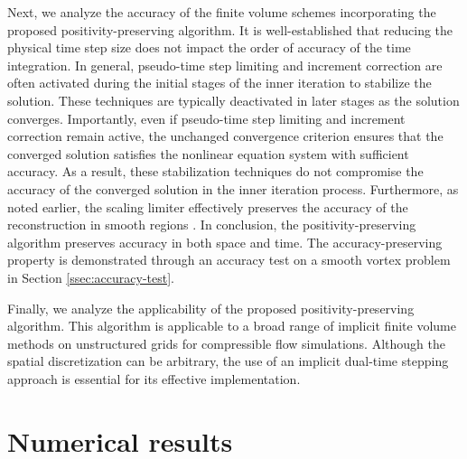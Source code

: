 Next, we analyze the accuracy of the finite volume schemes incorporating the proposed positivity-preserving algorithm. It is well-established that reducing the physical time step size does not impact the order of accuracy of the time integration.
In general, pseudo-time step limiting and increment correction are often activated during the initial stages of the inner iteration to stabilize the solution. These techniques are typically deactivated in later stages as the solution converges. Importantly, even if pseudo-time step limiting and increment correction remain active, the unchanged convergence criterion ensures that the converged solution satisfies the nonlinear equation system with sufficient accuracy. As a result, these stabilization techniques do not compromise the accuracy of the converged solution in the inner iteration process.
Furthermore, as noted earlier, the scaling limiter effectively preserves the accuracy of the reconstruction in smooth regions \cite{zhang2010positivity}.
In conclusion, the positivity-preserving algorithm preserves accuracy in both space and time. The accuracy-preserving property is demonstrated through an accuracy test on a smooth vortex problem in Section \ref{ssec:accuracy-test}.

Finally, we analyze the applicability of the proposed positivity-preserving algorithm. 
This algorithm is applicable to a broad range of implicit finite volume methods on unstructured grids for compressible flow simulations. Although the spatial discretization can be arbitrary, the use of an implicit dual-time stepping approach is essential for its effective implementation.

\section{Numerical results}
\label{sec:Results}

